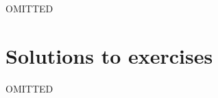 \documentclass[a4paper]{report}
\numberwithin{equation}{chapter}
\numberwithin{thm_counter}{section}
\begin{document}
OMITTED



\appendix


\chapter{Solutions to exercises}


OMITTED




\begin{warpprint}   %
\cleardoublepage    %
{}
\end{warpprint}
\ForceHTMLPage      %
\ForceHTMLTOC       %
\printindex
\end{document}
